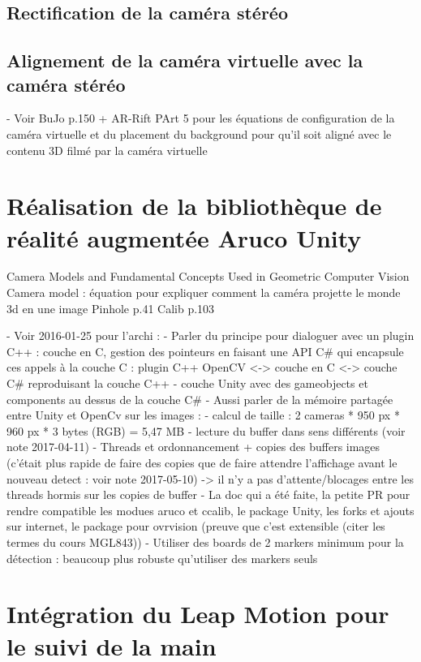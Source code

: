 \subsection{Rectification de la caméra stéréo}

\subsection{Alignement de la caméra virtuelle avec la caméra stéréo}
- Voir BuJo p.150 + AR-Rift PArt 5 pour les équations de configuration de la caméra virtuelle et du placement du background pour qu'il soit aligné avec le contenu 3D filmé par la caméra virtuelle


\section{Réalisation de la bibliothèque de réalité augmentée Aruco Unity}
\label{sec:aruco_unity}

Camera Models and Fundamental Concepts Used in Geometric Computer Vision
Camera model : équation pour expliquer comment la caméra projette le monde 3d en une image
Pinhole p.41
Calib p.103

- Voir 2016-01-25 pour l'archi :
  - Parler du principe pour dialoguer avec un plugin C++ : couche en C, gestion des pointeurs en faisant une API C\# qui encapsule ces appels à la couche C : plugin C++ OpenCV <-> couche en C <-> couche C\# reproduisant la couche C++ 
  - couche Unity avec des gameobjects et components au dessus de la couche C\#
- Aussi parler de la mémoire partagée entre Unity et OpenCv sur les images :
  - calcul de taille : 2 cameras * 950 px * 960 px * 3 bytes (RGB) = 5,47 MB
  - lecture du buffer dans sens différents (voir note 2017-04-11)
  - Threads et ordonnancement + copies des buffers images (c'était plus rapide de faire des copies que de faire attendre l'affichage avant le nouveau detect : voir note 2017-05-10) -> il n'y a pas d'attente/blocages entre les threads hormis sur les copies de buffer
- La doc qui a été faite, la petite PR pour rendre compatible les modues aruco et ccalib, le package Unity, les forks et ajouts sur internet, le package pour ovrvision (preuve que c'est extensible (citer les termes du cours MGL843))
- Utiliser des boards de 2 markers minimum pour la détection : beaucoup plus robuste qu'utiliser des markers seuls


\section{Intégration du Leap Motion pour le suivi de la main}


